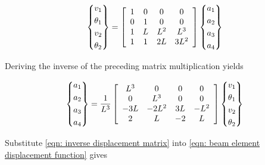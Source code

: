 \documentclass[a4paper,openany,12pt]{book}
\begin{document}
{{$$\left\{ \begin{gathered}
  v_1 \hfill \\
  \theta _1 \hfill \\
  v_2 \hfill \\
  \theta _2 \hfill \\ 
\end{gathered}  \right\} = \left[ {\begin{array}{*{20}{c}}
  1&0&0&0 \\ 
  0&1&0&0 \\ 
  1&L&L^2&L^3 \\ 
  1&1&2L&3L^2 
\end{array}} \right]\left\{ \begin{gathered}
  a_1 \hfill \\
  a_2 \hfill \\
  a_3 \hfill \\
  a_4 \hfill \\ 
\end{gathered}  \right\}$$

Deriving the inverse of the preceding matrix multiplication yields

\begin{gather*}
\label{eqn: inverse displacement matrix}
  \left\{
    \begin{gathered}
      a_1 \hfill \\
      a_2 \hfill \\
      a_3 \hfill \\
      a_4 \hfill \\ 
    \end{gathered}  \right\} = \frac{1}{L^3}\left[{
      \begin{array}{*{20}{c}}
        L^3&0&0&0 \\ 
        0&L^3&0&0 \\ 
        -3L&-2L^2&3L&-L^2 \\ 
        2&L&-2&L 
      \end{array}} \right]\left\{
    \begin{gathered}
      v_1 \hfill \\
      \theta_1 \hfill \\
      v_2 \hfill \\
      \theta_2 \hfill \\ 
    \end{gathered}  \right\}
\end{gather*}

Substitute
\ref{eqn: inverse displacement matrix}
into
\ref{eqn: beam element displacement function}
gives

}}
\end{document}

